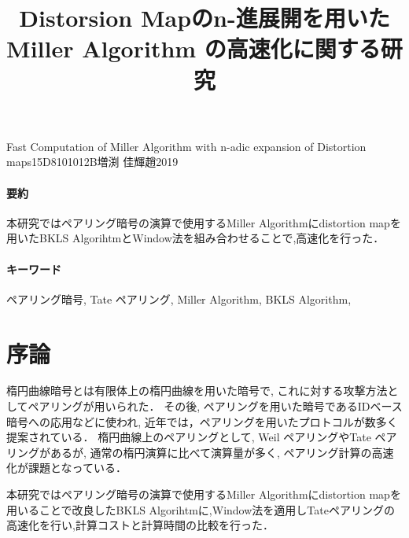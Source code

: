\documentclass[twocolumn]{jsarticle} %
\begin{document}
\title{Distorsion Mapのn-進展開を用いた \\ Miller Algorithm の高速化に関する研究}{Fast Computation of Miller Algorithm with n-adic expansion of Distortion maps}{15D8101012B}{増渕 佳輝}{趙}{2019}
\vspace{-5cm}
\paragraph{要約}
本研究ではペアリング暗号の演算で使用するMiller Algorithmにdistortion mapを用いたBKLS AlgorihtmとWindow法を組み合わせることで,高速化を行った．
\vspace{-2mm}
\paragraph{キーワード}
ペアリング暗号, Tate ペアリング, Miller Algorithm, BKLS Algorithm,
\vspace{-5mm}
\section{序論}


楕円曲線暗号とは有限体上の楕円曲線を用いた暗号で, これに対する攻撃方法としてペアリングが用いられた． その後, ペアリングを用いた暗号であるIDベース暗号への応用などに使われ,
近年では，ペアリングを用いたプロトコルが数多く提案されている．
楕円曲線上のペアリングとして,
Weil ペアリングやTate ペアリングがあるが, 通常の楕円演算に比べて演算量が多く, ペアリング計算の高速化が課題となっている．
\par

本研究ではペアリング暗号の演算で使用するMiller Algorithmにdistortion mapを用いることで改良したBKLS Algorihtmに,Window法を適用しTateペアリングの高速化を行い,計算コストと計算時間の比較を行った．
\end{document}
